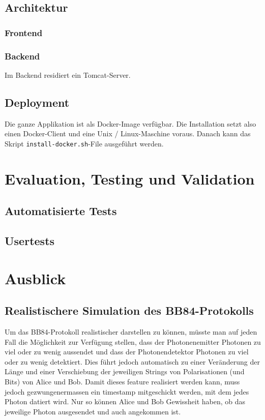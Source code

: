 \documentclass[a4paper,10.2pt,pdftex]{scrartcl}%
\begin{document}
\subsection{Architektur}
\subsubsection{Frontend}
\subsubsection{Backend}
Im Backend residiert ein Tomcat-Server. 
\subsection{Deployment}
Die ganze Applikation ist als Docker-Image verfügbar. Die Installation setzt also einen Docker-Client und eine Unix / Linux-Maschine voraus. Danach kann das Skript \texttt{install-docker.sh}-File ausgeführt werden. 

\section{Evaluation, Testing und Validation}
\subsection{Automatisierte Tests}
\subsection{Usertests}
\section{Ausblick}
\subsection{ Realistischere Simulation des BB84-Protokolls}

Um das BB84-Protokoll realistischer darstellen zu können, müsste man auf jeden Fall die Möglichkeit zur Verfügung stellen, dass der Photonenemitter Photonen zu viel oder zu wenig aussendet und dass der Photonendetektor Photonen zu viel oder zu wenig detektiert. Dies führt jedoch automatisch zu einer Veränderung der Länge und einer Verschiebung der jeweiligen Strings von Polarisationen (und Bits) von Alice und Bob. Damit dieses feature realisiert werden kann, muss jedoch gezwungenermassen ein timestamp mitgeschickt werden, mit dem jedes Photon datiert wird. Nur so können Alice und Bob Gewissheit haben, ob das jeweilige Photon ausgesendet und auch angekommen ist.
\end{document}

